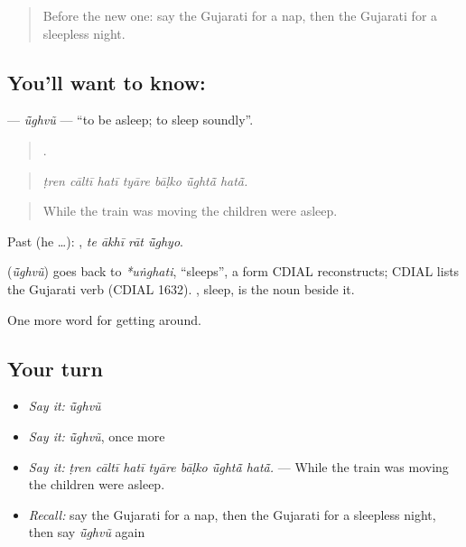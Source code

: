\label{lesson:GU-C398-ughvu}



\begin{quote}
Before the new one: say the Gujarati for a nap, then the Gujarati for a sleepless night.
\end{quote}

\subsection*{You'll want to know: }
\textbf{} — \emph{ū̃ghvũ} — \textquotedblleft{}to be asleep; to sleep soundly\textquotedblright{}.

\begin{quote}
      .
\end{quote}

\begin{quote}
\emph{ṭren cāltī hatī tyāre bāḷko ū̃ghtā̃ hatā̃.}
\end{quote}

\begin{quote}
While the train was moving the children were asleep.
\end{quote}

Past (he …):    , \emph{te ākhī rāt ū̃ghyo}.

\begin{cousinweb}
\textbf{} (\emph{ū̃ghvũ}) goes back to \emph{*uṅghati}, \textquotedblleft{}sleeps\textquotedblright{}, a form CDIAL reconstructs; CDIAL lists the Gujarati verb (CDIAL 1632). , sleep, is the noun beside it.
\end{cousinweb}

\begin{grammarlens}[title={What you've built}]
One more word for getting around.
\end{grammarlens}

\subsection*{Your turn}
\begin{itemize}
\raggedright
  \item \emph{Say it:} \emph{ū̃ghvũ}
  \item \emph{Say it:} \emph{ū̃ghvũ}, once more
  \item \emph{Say it:} \emph{ṭren cāltī hatī tyāre bāḷko ū̃ghtā̃ hatā̃.} — While the train was moving the children were asleep.
  \item \emph{Recall:} say the Gujarati for a nap, then the Gujarati for a sleepless night, then say \emph{ū̃ghvũ} again
\end{itemize}

